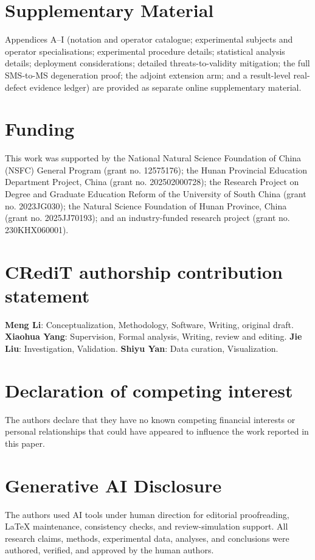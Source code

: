 \documentclass[manuscript,screen,review]{acmart}
\begin{document}


\section*{Supplementary Material}

Appendices A--I (notation and operator catalogue; experimental subjects and
operator specialisations; experimental procedure details; statistical analysis
details; deployment considerations; detailed threats-to-validity mitigation;
the full SMS-to-MS degeneration proof; the adjoint extension arm; and a
result-level real-defect evidence ledger) are provided as separate online
supplementary material.

\section*{Funding}

This work was supported by the National Natural Science Foundation of China
(NSFC) General Program (grant no. 12575176); the Hunan Provincial Education
Department Project, China (grant no. 202502000728); the Research Project on
Degree and Graduate Education Reform of the University of South China (grant
no. 2023JG030); the Natural Science Foundation of Hunan Province, China (grant
no. 2025JJ70193); and an industry-funded research project (grant no.
230KHX060001).

\section*{CRediT authorship contribution statement}

\textbf{Meng Li}: Conceptualization, Methodology, Software, Writing, original
draft. \textbf{Xiaohua Yang}: Supervision, Formal analysis, Writing, review
and editing. \textbf{Jie Liu}: Investigation, Validation. \textbf{Shiyu Yan}:
Data curation, Visualization.

\section*{Declaration of competing interest}

The authors declare that they have no known competing financial interests or
personal relationships that could have appeared to influence the work reported
in this paper.

\section*{Generative AI Disclosure}

The authors used AI tools under human direction for editorial proofreading,
LaTeX maintenance, consistency checks, and review-simulation support. All
research claims, methods, experimental data, analyses, and conclusions were
authored, verified, and approved by the human authors.



\end{document}
